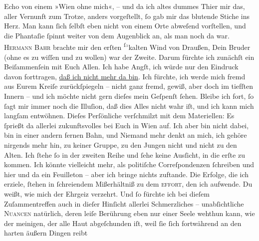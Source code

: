 \begin{ledgroupsized}[t]{13cm}
               Echo von einem »Wien ohne mich«, – und da ich altes
               dummes Thier mir das, aller Vernunft zum Trotze, anders vorgeſtellt, ſo  gab mir das blutende Stiche ins Herz. Man kann {\pb}ſich ſelbſt eben nicht von einem Orte abweſend
               vorſtellen, und die Phantaſie ſpinnt weiter von dem Augenblick an, als man noch da
               war. \textsc{Hermann Bahr}
               brachte mir den erſten \substVorne{}\textsuperscript{ſ\textcolor{gray}{a}}\substDazwischen{}ka\substHinten{}lten Wind von Draußen, Dein Bruder (ohne es zu wiſſen und zu wollen) war der Zweite. Darum fürchte ich
               zunächſt ein Beiſammenſein mit Euch Allen. Ich habe Angſt, ich würde nur den Eindruck
               davon forttragen, \uline{daß ich nicht mehr da bin}. Ich
               fürchte, ich werde mich fremd aus Eurem Kreiſe zurückſpiegeln – nicht ganz fremd,
               gewiß, {\pb}aber doch im tiefſten Innern – und ich
               möchte nicht gern \introOben{}dieſes\introOben{} mein Geſpenſt ſehen. Bleibe ich
               fort, ſo ſagt mir immer noch die Illuſion, daß dies Alles nicht wahr iſt, und ich
               kann mich langſam  entwöhnen. Dieſes Perſönliche
               verſchmilzt mit dem Materiellen: Es ſprießt da allerlei zukunftsvolles bei Euch in
                  Wien auf. Ich aber bin nicht dabei, bin in einer
               andern fernen Bahn, und Niemand mehr denkt an mich, ich gehöre nirgends mehr hin, zu
               keiner Gruppe, zu den Jungen nicht und nicht zu den Alten. Ich ſtehe ſo {\pb}in der zweiten Reihe und ſehe keine Ausſicht, in die
               erſte zu kommen. Ich könnte vielleicht mehr, als politiſche Correſpondenzen ſchreiben
               und hier und da ein Feuilleton – aber ich bringe nichts zuftande. Die Erfolge, die
               ich erziele, ſtehen in ſchreiendem Mißerhältniß zu dem \textsc{effort}, den ich aufwende. Du weißt, wie mich der Ehrgeiz verzehrt.  Und ſo fürchte ich bei dieſem Zuſammentreffen auch
               in dieſer Hinſicht allerlei Schmerzliches – unabſichtliche \textsc{Nuancen} natürlich,  deren leiſe Berührung
               eben nur einer Seele wehthun  kann, wie der
               meinigen, der alle Haut abgeſchunden iſt, weil ſie ſich fortwährend an den harten {\pb}äußern Dingen reibt{\dotsfive}\pend

\end{ledgroupsized}
